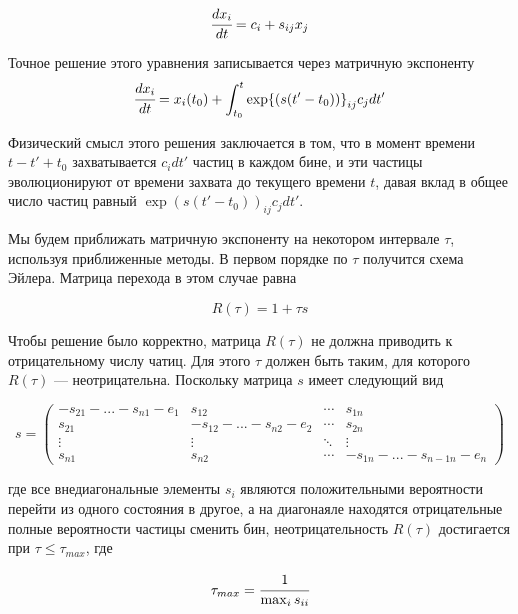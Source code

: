 \begin{equation}
	\label{eq:evol_x}
	\cfrac{d x_i}{d t}  = c_{i} + s_{ij} x_j
\end{equation}

Точное решение этого уравнения записывается через матричную экспоненту 
\begin{equation}
	\label{eq:evol_solve}
	\cfrac{d x_i}{d t}  = x_i(t_0) + \int_{t_0}^{t}{\exp{(s (t'-t_0))}_{ij}c_{j}dt'}
\end{equation}

Физический смысл этого решения заключается в том, что в момент времени $t-t'+t_0$ захватывается $c_i dt'$ частиц в каждом бине, и эти частицы эволюционируют от времени захвата до текущего времени $t$, давая вклад в общее число частиц равный $\exp{(s (t'-t_0))}_{ij}c_{j}dt'$. 

Мы будем приближать матричную экспоненту на некотором интервале $\tau$, используя приближенные методы. 
В первом порядке по $\tau$ получится схема Эйлера. Матрица перехода в этом случае равна

\begin{equation}
	\label{eq:R_tau_euler}
	R(\tau) = 1 + \tau s
\end{equation}

Чтобы решение было корректно, матрица $R(\tau)$ не должна приводить к отрицательному числу чатиц. Для этого $\tau$ должен быть таким, для которого $R(\tau)$ --- неотрицательна. Поскольку матрица $s$ имеет следующий вид 

\begin{equation*}
	\label{s_matrix_view}
	s = \begin{pmatrix}
		-s_{21}-...-s_{n1}-e_1 & s_{12} & \cdots & s_{1n} \\
		s_{21} & -s_{12}-... - s_{n2}-e_2 & \cdots & s_{2n} \\
		\vdots & \vdots & \ddots & \vdots \\
		s_{n1} & s_{n2} & \cdots & -s_{1n}-... - s_{n-1n}-e_n
	\end{pmatrix}
\end{equation*}

где все внедиагональные элементы $s_i$ являются положительными вероятности перейти из одного состояния в другое, а на диагонаяле находятся отрицательные полные вероятности частицы сменить бин, неотрицательность 
$R(\tau)$ достигается при $\tau  \le \tau_{max}$, где

\begin{equation}
	\label{eq:tau_max}
	\tau_{max} = \cfrac{1}{\max_i{s_{ii}}}
\end{equation}

